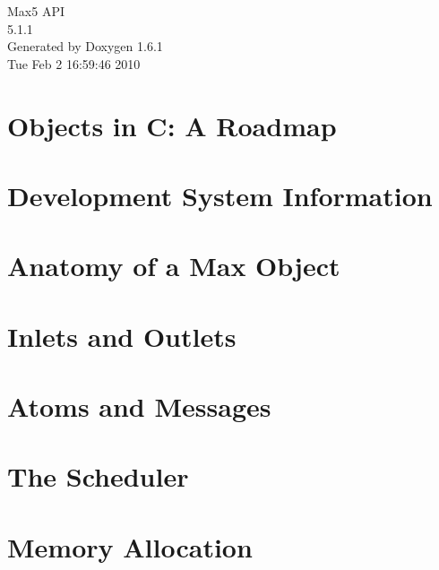 \documentclass[a4paper]{book}
\begin{document}
\hypersetup{pageanchor=false}
\begin{titlepage}
\vspace*{7cm}
\begin{center}
{\Large Max5 API \\[1ex]\large 5.1.1 }\\
\vspace*{1cm}
{\large Generated by Doxygen 1.6.1}\\
\vspace*{0.5cm}
{\small Tue Feb 2 16:59:46 2010}\\
\end{center}
\end{titlepage}
\clearemptydoublepage
{}
\tableofcontents
\clearemptydoublepage
{}
\hypersetup{pageanchor=true}
\chapter{Objects in C: A Roadmap}
\label{index}\hypertarget{index}{}
\chapter{Development System Information}
\label{chapter_platform}
\hypertarget{chapter_platform}{}

\chapter{Anatomy of a Max Object}
\label{chapter_anatomy}
\hypertarget{chapter_anatomy}{}

\chapter{Inlets and Outlets}
\label{chapter_inout}
\hypertarget{chapter_inout}{}

\chapter{Atoms and Messages}
\label{chapter_atoms}
\hypertarget{chapter_atoms}{}

\chapter{The Scheduler}
\label{chapter_scheduler}
\hypertarget{chapter_scheduler}{}

\chapter{Memory Allocation}
\label{chapter_memory}
\hypertarget{chapter_memory}{}

\end{document}
